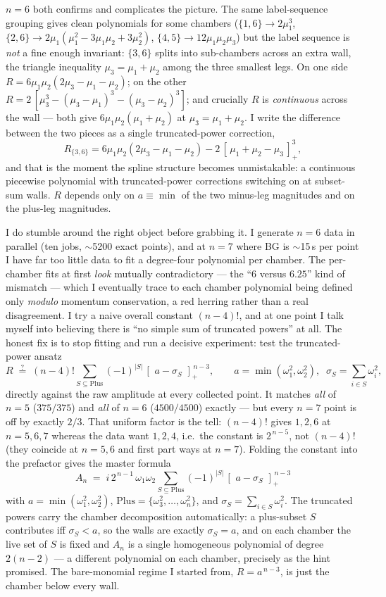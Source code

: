 \documentclass{article}
\newcommand{\pp}[1]{\left[\,#1\,\right]_{+}}
\begin{document}
$n=6$ both confirms and complicates the picture. The same label-sequence grouping
gives clean polynomials for some chambers ($\{1,6\}\to2\mu_1^3$,
$\{2,6\}\to2\mu_1(\mu_1^2-3\mu_1\mu_2+3\mu_2^2)$, $\{4,5\}\to12\mu_1\mu_2\mu_3$)
but the label sequence is \emph{not} a fine enough invariant: $\{3,6\}$ splits
into sub-chambers across an extra wall, the triangle inequality
$\mu_3=\mu_1+\mu_2$ among the three smallest legs. On one side
$R=6\mu_1\mu_2(2\mu_3-\mu_1-\mu_2)$; on the other
$R=2\,[\mu_3^3-(\mu_3-\mu_1)^3-(\mu_3-\mu_2)^3]$; and crucially $R$ is
\emph{continuous} across the wall --- both give $6\mu_1\mu_2(\mu_1+\mu_2)$ at
$\mu_3=\mu_1+\mu_2$. I write the difference between the two pieces as a single
truncated-power correction,
\[
R_{\{3,6\}}=6\mu_1\mu_2(2\mu_3-\mu_1-\mu_2)-2\,\pp{\mu_1+\mu_2-\mu_3}^{3},
\]
and that is the moment the spline structure becomes unmistakable: a continuous
piecewise polynomial with truncated-power corrections switching on at subset-sum
walls. $R$ depends only on $a\equiv\min$ of the two minus-leg magnitudes and on
the plus-leg magnitudes.

I do stumble around the right object before grabbing it. I generate $n=6$ data in
parallel (ten jobs, $\sim$5200 exact points), and at $n=7$ where BG is
$\sim$15\,s per point I have far too little data to fit a degree-four polynomial
per chamber. The per-chamber fits at first \emph{look} mutually contradictory ---
the ``$6$ versus $6.25$'' kind of mismatch --- which I eventually trace to each
chamber polynomial being defined only \emph{modulo} momentum conservation, a red
herring rather than a real disagreement. I try a naive overall constant
$(n-4)!$, and at one point I talk myself into believing there is ``no simple sum
of truncated powers'' at all. The honest fix is to stop fitting and run a
decisive experiment: test the truncated-power ansatz
\[
R \;\stackrel{?}{=}\; (n-4)!\sum_{S\subseteq\mathrm{Plus}}(-1)^{|S|}\,
\pp{\,a-\sigma_S\,}^{\,n-3},\qquad
a=\min(\omega_1^2,\omega_2^2),\;\;\sigma_S=\sum_{i\in S}\omega_i^2,
\]
directly against the raw amplitude at every collected point. It matches
\emph{all} of $n=5$ ($375/375$) and \emph{all} of $n=6$ ($4500/4500$) exactly ---
but every $n=7$ point is off by exactly $2/3$. That uniform factor is the tell:
$(n-4)!$ gives $1,2,6$ at $n=5,6,7$ whereas the data want $1,2,4$, i.e.\ the
constant is $2^{\,n-5}$, not $(n-4)!$ (they coincide at $n=5,6$ and first part
ways at $n=7$). Folding the constant into the prefactor gives the master formula
\[
\boxed{\;
A_n \;=\; i\,2^{\,n-1}\,\omega_1\omega_2
\sum_{S\subseteq\mathrm{Plus}}(-1)^{|S|}\,
\pp{\,a-\sigma_S\,}^{\,n-3}\;}
\]
with $a=\min(\omega_1^2,\omega_2^2)$, $\mathrm{Plus}=\{\omega_3^2,\dots,
\omega_n^2\}$, and $\sigma_S=\sum_{i\in S}\omega_i^2$. The truncated powers carry
the chamber decomposition automatically: a plus-subset $S$ contributes iff
$\sigma_S<a$, so the walls are exactly $\sigma_S=a$, and on each chamber the live
set of $S$ is fixed and $A_n$ is a single homogeneous polynomial of degree
$2(n-2)$ --- a different polynomial on each chamber, precisely as the hint
promised. The bare-monomial regime I started from, $R=a^{\,n-3}$, is just the
chamber below every wall.
\end{document}

